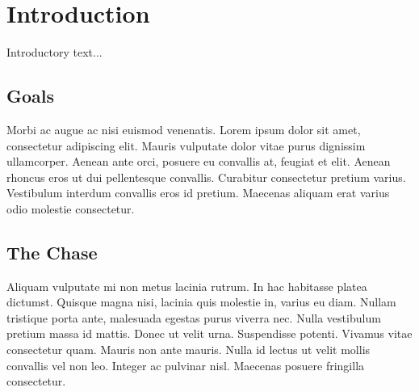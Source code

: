 \section{Introduction}

	Introductory text...

	\subsection{Goals}

	Morbi ac augue ac nisi euismod venenatis. Lorem ipsum dolor sit amet,
	consectetur adipiscing elit. Mauris vulputate dolor vitae purus dignissim
	ullamcorper. Aenean ante orci, posuere eu convallis at, feugiat et elit.
	Aenean rhoncus eros ut dui pellentesque convallis. Curabitur consectetur
	pretium varius. Vestibulum interdum convallis eros id pretium. Maecenas
	aliquam erat varius odio molestie consectetur.

	\subsection{The Chase}

	Aliquam vulputate mi non metus lacinia rutrum. In hac habitasse platea
	dictumst. Quisque magna nisi, lacinia quis molestie in, varius eu diam.
	Nullam tristique porta ante, malesuada egestas purus viverra nec. Nulla
	vestibulum pretium massa id mattis. Donec ut velit urna. Suspendisse
	potenti. Vivamus vitae consectetur quam. Mauris non ante mauris. Nulla id
	lectus ut velit mollis convallis vel non leo. Integer ac pulvinar nisl.
	Maecenas posuere fringilla consectetur.
